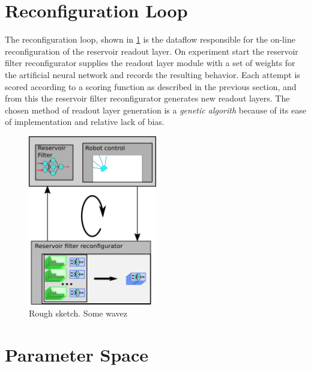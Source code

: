 \section{Reconfiguration Loop}
The reconfiguration loop, shown in \ref{figReconfLoop} is the dataflow
responsible for the on-line reconfiguration of the reservoir readout layer.
On experiment start the reservoir filter reconfigurator supplies the readout
layer module with a set of weights for the artificial neural network and records
the resulting behavior.
Each attempt is scored according to a scoring function as described in the
previous section, and from this the reservoir filter reconfigurator generates
new readout layers.
The chosen method of readout layer generation is a \emph{genetic algorith}
because of its ease of implementation and relative lack of bias.
\begin{figure}[h!]
  \centering
  \includegraphics[width=0.5\textwidth]{fig/reconfigLoop.png}
  \caption{Rough sketch.
    Some wavez
  }
  \label{figReconfLoop}
\end{figure}
\section{Parameter Space}
\cleardoublepage

